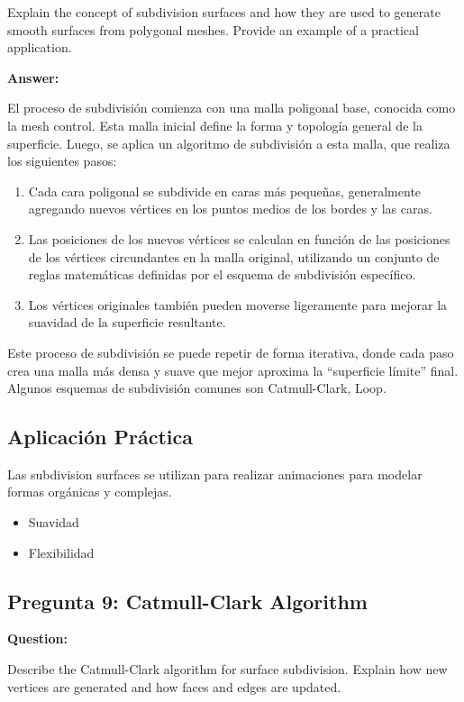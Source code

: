 \documentclass{article}
\begin{document}
Explain the concept of subdivision surfaces and how they are used to generate smooth surfaces from polygonal meshes. Provide an example of a practical application.

\textbf{Answer:}

El proceso de subdivisión comienza con una malla poligonal base, conocida como la mesh control. Esta malla inicial define la forma y topología general de la superficie. Luego, se aplica un algoritmo de subdivisión a esta malla, que realiza los siguientes pasos:

\begin{enumerate}
    \item Cada cara poligonal se subdivide en caras más pequeñas, generalmente agregando nuevos vértices en los puntos medios de los bordes y las caras.
    \item Las posiciones de los nuevos vértices se calculan en función de las posiciones de los vértices circundantes en la malla original, utilizando un conjunto de reglas matemáticas definidas por el esquema de subdivisión específico.
    \item Los vértices originales también pueden moverse ligeramente para mejorar la suavidad de la superficie resultante.
\end{enumerate}

Este proceso de subdivisión se puede repetir de forma iterativa, donde cada paso crea una malla más densa y suave que mejor aproxima la ``superficie límite'' final. Algunos esquemas de subdivisión comunes son Catmull-Clark, Loop.

\subsection{Aplicación Práctica}

Las subdivision surfaces se utilizan para realizar animaciones para modelar formas orgánicas y complejas.

\begin{itemize}
    \item Suavidad
    \item Flexibilidad
\end{itemize}

\subsection{Pregunta 9: Catmull-Clark Algorithm}

\textbf{Question:} 

Describe the Catmull-Clark algorithm for surface subdivision. Explain how new vertices are generated and how faces and edges are updated.
\end{document}
